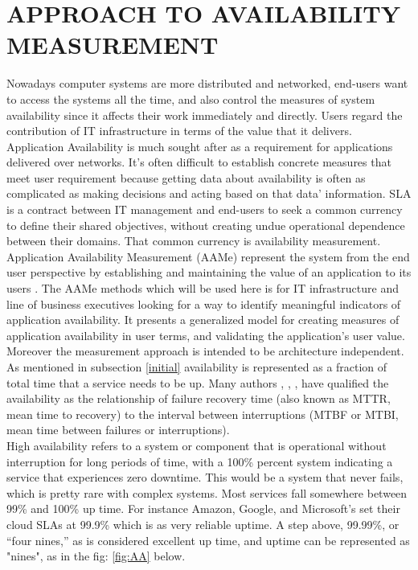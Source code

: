 \documentclass[english]{tktltiki2}
\theoremstyle{definition}
\theoremstyle{remark}
\begin{document}
\section{APPROACH TO AVAILABILITY MEASUREMENT}
Nowadays computer systems are more distributed and networked, end-users want to access the systems all the time, and also control the measures of system availability since it affects their work immediately and directly. Users regard the contribution of IT infrastructure in terms of the value that it delivers. Application Availability is much  sought after as a requirement for applications delivered over networks. It's often difficult to establish concrete measures that meet user requirement because getting  data about availability is often as complicated as making decisions and acting based on that data’ information. SLA is a contract  between IT management and end-users to seek a common currency to define their shared objectives, without creating undue operational dependence between their domains. That common currency is availability measurement.\\
Application Availability Measurement (AAMe)  represent the system  from the end user perspective by establishing and maintaining the value of an application to its users \cite{AAMES}.
The AAMe methods which will be used here is for IT infrastructure and line of business executives looking for a way to identify meaningful indicators of application availability. It presents a generalized model for creating measures of application availability in user terms, and validating the application's user value. Moreover the measurement approach is intended to be architecture independent.\\
As mentioned in subsection \ref{initial} availability is represented as a fraction of total time that a service needs to be up. Many authors \cite{AAMES}, \cite{article1}, \cite{1672218}, \cite{AvalDisgest} have qualified the  availability as the relationship of failure recovery time (also known as MTTR, mean time to recovery) to the interval between interruptions (MTBF or MTBI, mean time between failures or interruptions).\\
High availability refers to a system or component that is operational without interruption for long periods of time, with a 100\% percent system indicating a service that experiences zero downtime. This would be a system that never fails, which is pretty rare with complex systems. Most services fall somewhere between 99\% and 100\% up time.  For instance  Amazon, Google, and Microsoft’s set their cloud SLAs at 99.9\% which is  as very reliable uptime. A step above, 99.99\%, or “four nines,” as is considered excellent up time, and uptime can be represented as "nines", as in the fig: \ref{fig:AA} below.\\
\end{document}
